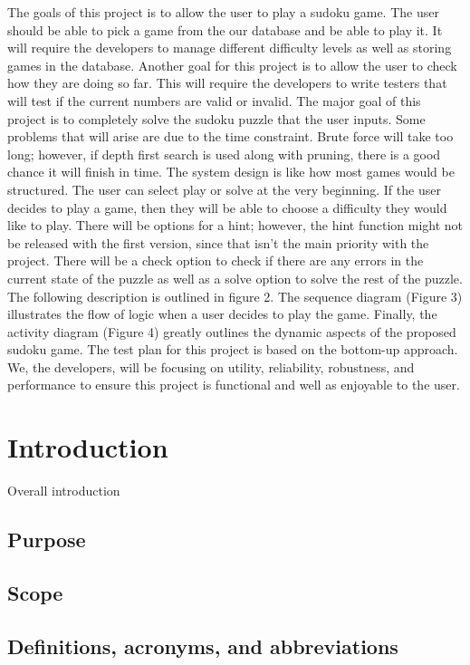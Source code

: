 \documentclass{article}
\begin{document}
	The goals of this project is to allow the user to play a sudoku game. The user should be able to pick a game from the our database and be able to play it. It will require the developers to manage different difficulty levels as well as storing games in the database. Another goal for this project is to allow the user to check how they are doing so far. This will require the developers to write testers that will test if the current numbers are valid or invalid. The major goal of this project is to completely solve the sudoku puzzle that the user inputs. Some problems that will arise are due to the time constraint. Brute force will take too long; however, if depth first search is used along with pruning, there is a good chance it will finish in time.
	The system design is like how most games would be structured. The user can select play or solve at the very beginning. If the user decides to play a game, then they will be able to choose a difficulty they would like to play. There will be options for a hint; however, the hint function might not be released with the first version, since that isn’t the main priority with the project. There will be a check option to check if there are any errors in the current state of the puzzle as well as a solve option to solve the rest of the puzzle.  The following description is outlined in figure 2. The sequence diagram (Figure 3) illustrates the flow of logic when a user decides to play the game. Finally, the activity diagram (Figure 4) greatly outlines the dynamic aspects of the proposed sudoku game.
The test plan for this project is based on the bottom-up approach. We, the developers, will be focusing on utility, reliability, robustness, and performance to ensure this project is functional and well as enjoyable to the user.



 
\section{Introduction}
 
Overall introduction
\subsection{Purpose}
\subsection{Scope}
\subsection{Definitions, acronyms, and abbreviations}
\end{document}
